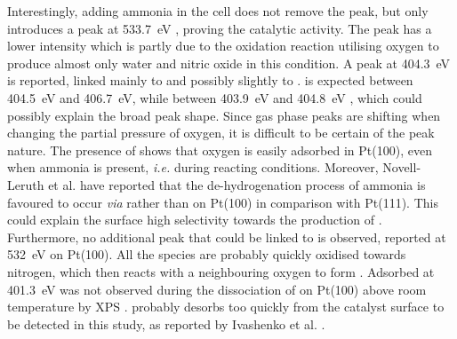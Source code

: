 Interestingly, adding ammonia in the cell does not remove the  peak, but only introduces a  peak at \qty{533.7}{\eV} \parencite{Weststrate2006, Linford2019}, proving the catalytic activity.
The  peak has a lower intensity which is partly due to the oxidation reaction utilising oxygen to produce almost only water and nitric oxide in this condition.
A peak at \qty{404.3}{\eV} is reported, linked mainly to  and possibly slightly to .
 is expected between \qty{404.5}{\eV} and \qty{406.7}{\eV}, while  between \qty{403.9}{\eV} and \qty{404.8}{\eV} \parencite{Ivashenko2021}, which could possibly explain the broad peak shape.
Since gas phase peaks are shifting when changing the partial pressure of oxygen, it is difficult to be certain of the peak nature.
The presence of  shows that oxygen is easily adsorbed in Pt(100), even when ammonia is present, \textit{i.e.} during reacting conditions.
Moreover, Novell-Leruth et al. \parencite*{NovellLeruth2008} have reported that the de-hydrogenation process of ammonia is favoured to occur \textit{via}  rather than  on Pt(100) in comparison with Pt(111).
This could explain the surface high selectivity towards the production of .
Furthermore, no additional peak that could be linked to  is observed, reported at \qty{532}{\eV} on Pt(100).
All the  species are probably quickly oxidised towards nitrogen, which then reacts with a neighbouring oxygen to form .
Adsorbed  at \qty{401.3}{\eV} was not observed during the dissociation of  on Pt(100) above room temperature by XPS \parencite{Rienks2003}.
 probably desorbs too quickly from the catalyst surface to be detected in this study, as reported by Ivashenko et al. \parencite*{Ivashenko2021}.

